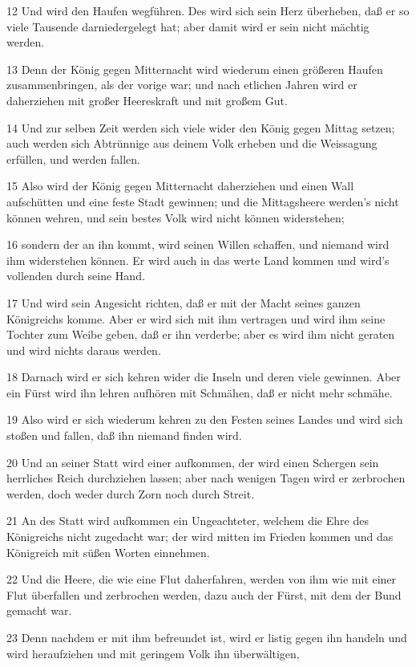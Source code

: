 \par 12 Und wird den Haufen wegführen. Des wird sich sein Herz überheben, daß er so viele Tausende darniedergelegt hat; aber damit wird er sein nicht mächtig werden.
\par 13 Denn der König gegen Mitternacht wird wiederum einen größeren Haufen zusammenbringen, als der vorige war; und nach etlichen Jahren wird er daherziehen mit großer Heereskraft und mit großem Gut.
\par 14 Und zur selben Zeit werden sich viele wider den König gegen Mittag setzen; auch werden sich Abtrünnige aus deinem Volk erheben und die Weissagung erfüllen, und werden fallen.
\par 15 Also wird der König gegen Mitternacht daherziehen und einen Wall aufschütten und eine feste Stadt gewinnen; und die Mittagsheere werden's nicht können wehren, und sein bestes Volk wird nicht können widerstehen;
\par 16 sondern der an ihn kommt, wird seinen Willen schaffen, und niemand wird ihm widerstehen können. Er wird auch in das werte Land kommen und wird's vollenden durch seine Hand.
\par 17 Und wird sein Angesicht richten, daß er mit der Macht seines ganzen Königreichs komme. Aber er wird sich mit ihm vertragen und wird ihm seine Tochter zum Weibe geben, daß er ihn verderbe; aber es wird ihm nicht geraten und wird nichts daraus werden.
\par 18 Darnach wird er sich kehren wider die Inseln und deren viele gewinnen. Aber ein Fürst wird ihn lehren aufhören mit Schmähen, daß er nicht mehr schmähe.
\par 19 Also wird er sich wiederum kehren zu den Festen seines Landes und wird sich stoßen und fallen, daß ihn niemand finden wird.
\par 20 Und an seiner Statt wird einer aufkommen, der wird einen Schergen sein herrliches Reich durchziehen lassen; aber nach wenigen Tagen wird er zerbrochen werden, doch weder durch Zorn noch durch Streit.
\par 21 An des Statt wird aufkommen ein Ungeachteter, welchem die Ehre des Königreichs nicht zugedacht war; der wird mitten im Frieden kommen und das Königreich mit süßen Worten einnehmen.
\par 22 Und die Heere, die wie eine Flut daherfahren, werden von ihm wie mit einer Flut überfallen und zerbrochen werden, dazu auch der Fürst, mit dem der Bund gemacht war.
\par 23 Denn nachdem er mit ihm befreundet ist, wird er listig gegen ihn handeln und wird heraufziehen und mit geringem Volk ihn überwältigen,

